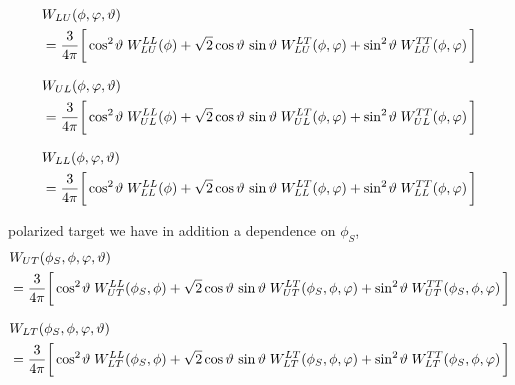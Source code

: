\documentclass[12pt]{article}
\newcommand{\bs}{\mskip -1.5mu}
\newcommand{\0}{{\mskip 2.5mu} 0 {\mskip 2.5mu}}
\begin{document}
\begin{align}
  \label{W-dec1}
& W_{LU}(\phi,\varphi,\vartheta) 
\nonumber \\
& = \frac{3}{4\pi} \biggl[\,
     \cos^2\bs\vartheta\; W_{LU}^{LL}(\phi)
   + \sqrt{2} \cos\vartheta\, \sin\vartheta\;
                          W_{LU}^{LT}(\phi,\varphi)
   + \sin^2\bs\vartheta\; W_{LU}^{TT}(\phi,\varphi)
   \,\biggr]
\end{align}


\begin{align}
  \label{W-dec2}
& W_{UL}(\phi,\varphi,\vartheta) 
\nonumber \\
& = \frac{3}{4\pi} \biggl[\,
     \cos^2\bs\vartheta\; W_{UL}^{LL}(\phi)
   + \sqrt{2} \cos\vartheta\, \sin\vartheta\;
                          W_{UL}^{LT}(\phi,\varphi)
   + \sin^2\bs\vartheta\; W_{UL}^{TT}(\phi,\varphi)
   \,\biggr]
\end{align}


\begin{align}
  \label{W-dec3}
& W_{LL}(\phi,\varphi,\vartheta) 
\nonumber \\
& = \frac{3}{4\pi} \biggl[\,
     \cos^2\bs\vartheta\; W_{LL}^{LL}(\phi)
   + \sqrt{2} \cos\vartheta\, \sin\vartheta\;
                          W_{LL}^{LT}(\phi,\varphi)
   + \sin^2\bs\vartheta\; W_{LL}^{TT}(\phi,\varphi)
   \,\biggr]
\end{align}


polarized target we have in addition a dependence on $\phi_S$,
\begin{align}
& W_{UT}(\phi_S,\phi,\varphi,\vartheta) 
\nonumber \\
& = \frac{3}{4\pi} \biggl[\,
     \cos^2\bs\vartheta\; W_{UT}^{LL}(\phi_S,\phi)
   + \sqrt{2} \cos\vartheta\, \sin\vartheta\;
                          W_{UT}^{LT}(\phi_S,\phi,\varphi)
   + \sin^2\bs\vartheta\; W_{UT}^{TT}(\phi_S,\phi,\varphi)
   \,\biggr]
\end{align}

\begin{align}
& W_{LT}(\phi_S,\phi,\varphi,\vartheta) 
\nonumber \\
& = \frac{3}{4\pi} \biggl[\,
     \cos^2\bs\vartheta\; W_{LT}^{LL}(\phi_S,\phi)
   + \sqrt{2} \cos\vartheta\, \sin\vartheta\;
                          W_{LT}^{LT}(\phi_S,\phi,\varphi)
   + \sin^2\bs\vartheta\; W_{LT}^{TT}(\phi_S,\phi,\varphi)
   \,\biggr]
\end{align}
\end{document}
